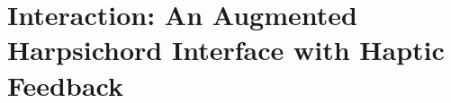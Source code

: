 \chapter{Interaction: An Augmented Harpsichord Interface with Haptic Feedback}\label{chapter:keyboard}
